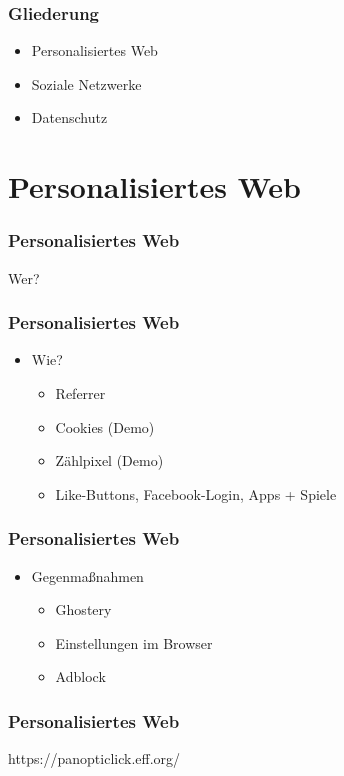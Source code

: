 \documentclass[12pt]{beamer}
\begin{document}
\begin{frame}
  \frametitle{Gliederung}
  \begin{itemize} \Large
    \item Personalisiertes Web
    \item Soziale Netzwerke
    \item Datenschutz
  \end{itemize}
\end{frame}

\section{Personalisiertes Web}

\begin{frame}
  \frametitle{Personalisiertes Web}
  \begin{center} \Large
  Wer?
  \end{center}
\end{frame}

\begin{frame}
  \frametitle{Personalisiertes Web}
  \begin{itemize}
    \item<1-> Wie?
      \begin{itemize}
        \item<2-> Referrer
        \item<3-> Cookies (Demo)
        \item<4-> Zählpixel (Demo)
        \item<5-> Like-Buttons, Facebook-Login, Apps + Spiele
      \end{itemize}
  \end{itemize}
\end{frame}

\begin{frame}
  \frametitle{Personalisiertes Web}
  \begin{itemize}
    \item<1-> Gegenmaßnahmen 
      \begin{itemize}
        \item<2-> Ghostery
        \item<3-> Einstellungen im Browser
        \item<4-> Adblock
      \end{itemize}
  \end{itemize}
\end{frame}

\begin{frame}
  \frametitle{Personalisiertes Web}
  \begin{center} \Large
    https://panopticlick.eff.org/
  \end{center}
\end{frame}
\end{document}
